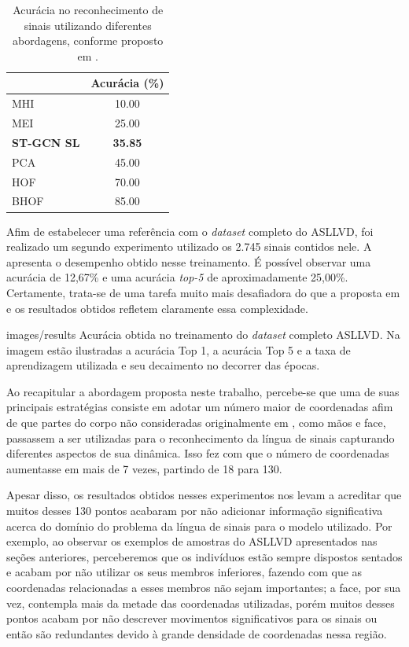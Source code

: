 \begin{table}[ht]
\centering
\caption{Acurácia no reconhecimento de sinais utilizando diferentes abordagens, conforme proposto em \cite{lim-2016}.}
\label{tab:results-comparison-20}
\begin{tabular}{lc}
\hline
                   & Acurácia (\%)  \\ \hline
MHI                & 10.00                     \\
MEI                & 25.00                     \\
\textbf{ST-GCN SL} & \textbf{35.85}            \\
PCA                & 45.00                     \\
HOF                & 70.00                     \\
BHOF               & 85.00                     \\ \hline
\end{tabular}
\end{table}



Afim de estabelecer uma referência com o \textit{dataset} completo do ASLLVD, foi realizado um segundo experimento utilizado os 2.745 sinais contidos nele. A  apresenta o desempenho obtido nesse treinamento. É possível observar uma acurácia de 12,67\% e uma acurácia \textit{top-5} de aproximadamente 25,00\%. Certamente, trata-se de uma tarefa muito mais desafiadora do que a proposta em \cite{lim-2016} e os resultados obtidos refletem claramente essa complexidade. 

    {images/results}
    {Acurácia obtida no treinamento do \textit{dataset} completo ASLLVD. Na imagem estão ilustradas a acurácia Top 1, a acurácia Top 5 e a taxa de aprendizagem utilizada e seu decaimento no decorrer das épocas.}


Ao recapitular a abordagem proposta neste trabalho, percebe-se que uma de suas principais estratégias consiste em adotar um número maior de coordenadas afim de que partes do corpo não consideradas originalmente em \cite{st-gcn-2018}, como mãos e face, passassem a ser utilizadas para o reconhecimento da língua de sinais capturando diferentes aspectos de sua dinâmica. Isso fez com que o número de coordenadas aumentasse em mais de 7 vezes, partindo de 18 para 130. 

Apesar disso, os resultados obtidos nesses experimentos nos levam a acreditar que muitos desses 130 pontos acabaram por não adicionar informação significativa acerca do domínio do problema da língua de sinais para o modelo utilizado. Por exemplo, ao observar os exemplos de amostras do ASLLVD apresentados nas seções anteriores, perceberemos que os indivíduos estão sempre dispostos sentados e acabam por não utilizar os seus membros inferiores, fazendo com que as coordenadas relacionadas a esses membros não sejam importantes; a face, por sua vez, contempla mais da metade das coordenadas utilizadas, porém muitos desses pontos acabam por não descrever movimentos significativos para os sinais ou então são redundantes devido à grande densidade de coordenadas nessa região. 

